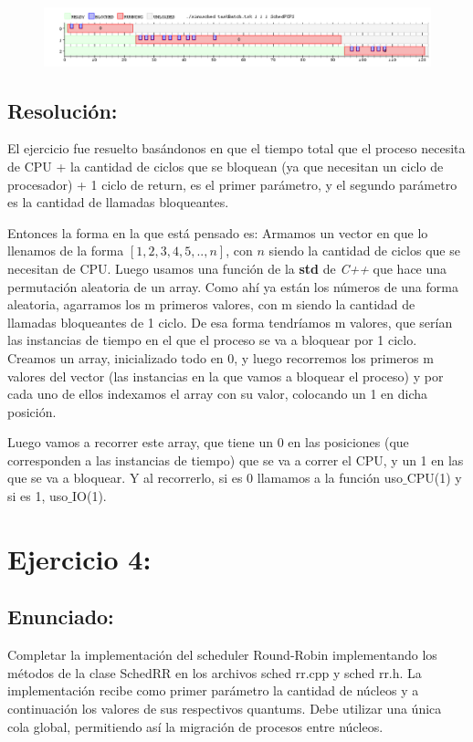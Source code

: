 \documentclass[10pt, a4paper]{article}
\begin{document}
\begin{figure}[H]
  	\centering
   	\includegraphics[width=1\textwidth]
   	 {imgs/Batch.png}
	\caption{}
\end{figure}



\subsection{Resolución:}

El ejercicio fue resuelto  basándonos en que el tiempo total que el proceso necesita de CPU + la cantidad de ciclos que se bloquean (ya que necesitan un ciclo de procesador) + 1 ciclo de return, es el primer parámetro, y el segundo parámetro es la cantidad de llamadas bloqueantes.

 Entonces la forma en la que está pensado es: Armamos un vector en  que lo llenamos de la forma  $[1,2,3,4,5,..,n]$, con $n$ siendo la cantidad de ciclos que se necesitan de CPU. Luego usamos una función de la \textbf{std} de \textit{C++} que hace una permutación aleatoria de un array. Como ahí ya están los números de una forma aleatoria, agarramos los m primeros valores, con m siendo la cantidad de llamadas bloqueantes de 1 ciclo. 
De esa forma tendríamos m valores, que serían las instancias de tiempo en el que el proceso se va a bloquear por 1 ciclo. Creamos un array, inicializado  todo en 0, y luego recorremos los primeros m valores del vector (las instancias en la que vamos a bloquear el proceso) y  por cada uno de ellos indexamos el array con su valor, colocando  un 1 en dicha posición.

 Luego vamos a recorrer este array, que tiene un 0 en las posiciones (que corresponden a las instancias de tiempo) que se va a correr el CPU, y un 1 en las que se va a bloquear. Y al recorrerlo, si es 0 llamamos a la función uso$\_$CPU(1) y si es 1, uso$\_$IO(1).   

\section{Ejercicio 4:}
\subsection{Enunciado:}
Completar la implementación del scheduler Round-Robin implementando los
métodos de la clase SchedRR en los archivos sched rr.cpp y sched rr.h. La implementación
recibe como primer parámetro la cantidad de núcleos y a continuación los valores de sus
respectivos quantums. Debe utilizar una única cola global, permitiendo así la migración de procesos entre núcleos.
\end{document}

